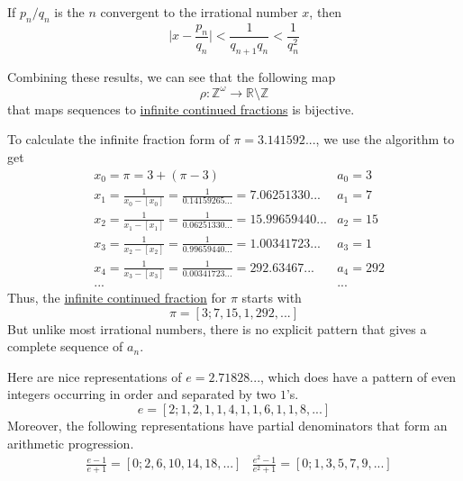 \documentclass{article}
\newcounter{theorem}[section]
\newcounter{example}[section]
\begin{document}
\begin{corollary}
  \label{thm:convergent-irrational-number}
If $p_n / q_n$ is the $n$ convergent to the irrational number $x$, then 
\begin{equation}
  \bigg| x - \frac{p_n}{q_n} \bigg| < \frac{1}{q_{n+1} q_n} < \frac{1}{q_n^2}
\end{equation}
\end{corollary}

Combining these results, we can see that the following map 
\begin{equation}
  \rho: \mathbb{Z}^\omega \to \mathbb{R} \setminus \mathbb{Z}
\end{equation}
that maps sequences to \hyperref[def:infinite-continued-fraction]{infinite continued fractions} is bijective. 

\begin{example}
  \label{ex:calculate-infinite-fraction-form-use}
To calculate the infinite fraction form of $\pi = 3.141592...$, we use the algorithm to get
\begin{align*}
    &x_0 = \pi = 3 + (\pi-3) & a_0 = 3 \\
    &x_1 = \frac{1}{x_0 - [x_0]} = \frac{1}{0.14159265...} = 7.06251330... & a_1 = 7\\
    &x_2 = \frac{1}{x_1 - [x_1]} = \frac{1}{0.06251330...} = 15.99659440... & a_2 = 15\\
    &x_3 = \frac{1}{x_2 - [x_2]} = \frac{1}{0.99659440...} = 1.00341723... & a_3 = 1\\
    &x_4 = \frac{1}{x_3 - [x_3]} = \frac{1}{0.00341723...} = 292.63467... & a_4 = 292\\
    & ... & ...
\end{align*}
Thus, the \hyperref[def:infinite-continued-fraction]{infinite continued fraction} for $\pi$ starts with 
\begin{equation}
  \pi = [3;7, 15, 1, 292, ...]
\end{equation}
But unlike most irrational numbers, there is no explicit pattern that gives a complete sequence of $a_n$. 
\end{example}

\begin{theorem}[Euler]
  \label{thm:euler-2}
Here are nice representations of $e = 2.71828...$, which does have a pattern of even integers occurring in order and separated by two $1$'s. 
\begin{equation}
  e = [2; 1, 2, 1, 1, 4, 1, 1, 6, 1, 1, 8, ...]
\end{equation}
Moreover, the following representations have partial denominators that form an arithmetic progression. 
\begin{align*}
    & \frac{e-1}{e+1} = [0;2, 6, 10, 14, 18, ...]
    & \frac{e^2 - 1}{e^2 + 1} = [0; 1, 3, 5, 7, 9, ...]
\end{align*}
\end{theorem}
\end{document}
